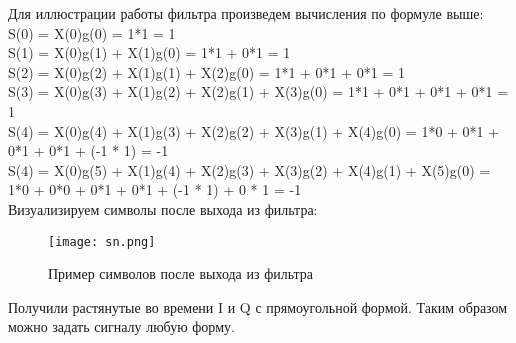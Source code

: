 Для иллюстрации работы фильтра произведем вычисления по формуле выше:\\

S(0) = X(0)g(0) = 1*1 = 1\\

S(1) = X(0)g(1) + X(1)g(0) = 1*1 + 0*1 = 1 \\

S(2) = X(0)g(2) + X(1)g(1) + X(2)g(0) = 1*1 + 0*1 + 0*1 = 1 \\

S(3) = X(0)g(3) + X(1)g(2) + X(2)g(1) + X(3)g(0) = 1*1 + 0*1 + 0*1 + 0*1 = 1\\

S(4) = X(0)g(4) + X(1)g(3) + X(2)g(2) + X(3)g(1) + X(4)g(0) = 1*0 + 0*1 + 0*1 + 0*1 + (-1 * 1) = -1\\

S(4) = X(0)g(5) + X(1)g(4) + X(2)g(3) + X(3)g(2) + X(4)g(1) + X(5)g(0) = 1*0 + 0*0 + 0*1 + 0*1 + (-1 * 1) + 0 * 1 = -1\\

Визуализируем символы после выхода из фильтра:

\begin{figure}[H]
    \centering
    \texttt{[image: sn.png]}
    \caption{Пример символов после выхода из фильтра}
\end{figure}

Получили растянутые во времени I и Q с прямоугольной формой. Таким образом можно задать сигналу любую форму.

\endinput

